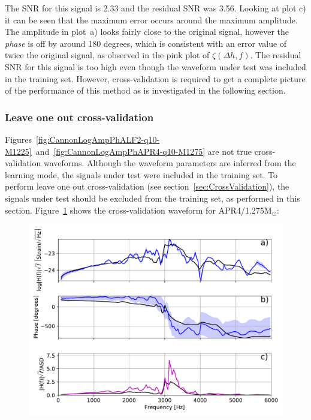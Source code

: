 The SNR for this signal is 2.33 and the residual SNR was 3.56. Looking at plot c) it can be seen that the maximum error occurs around the maximum amplitude. The amplitude in plot~a) looks fairly close to the original signal, however the \textit{phase} is off by around 180 degrees, which is consistent with an error value of twice the original signal, as observed in the pink plot of $\zeta(\Delta h,f)$. The residual SNR for this signal is too high even though the waveform under test was included in the training set. However, cross-validation is required to get a complete picture of the performance of this method as is investigated in the following section. 
\subsubsection{Leave one out cross-validation}
\label{sec:TheCannonLOOCV}
Figures~\ref{fig:CannonLogAmpPhALF2-q10-M1225}~and~\ref{fig:CannonLogAmpPhAPR4-q10-M1275} are not true cross-validation waveforms. Although the waveform parameters are inferred from the learning mode, the signals under test were included in the training set. To perform leave one out cross-validation (see section~\ref{sec:CrossValidation}), the signals under test should be excluded from the training set, as performed in this section. Figure~\ref{fig:CannonLogAmpPhAPR4-q10-M1275-cv} shows the cross-validation waveform for APR4/1.275M$_\odot$:
\begin{figure}[H]
	\includegraphics[width=15cm]{./img/CannonLogAmpPhAPR4-q10-M1275-cv.pdf} 
	\caption[\protect]{\protect}
	\label{fig:CannonLogAmpPhAPR4-q10-M1275-cv}
\end{figure}
